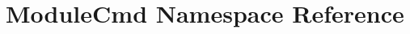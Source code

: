 \hypertarget{namespaceModuleCmd}{\section{Module\-Cmd Namespace Reference}
\label{namespaceModuleCmd}
}
